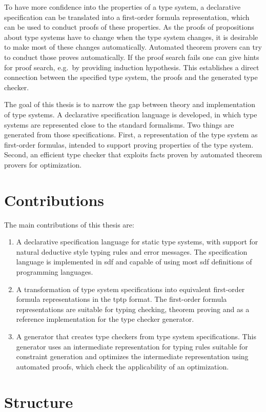 To have more confidence into the properties of a type system, a
declarative specification can be translated into a first-order formula
representation, which can be used to conduct proofs of these
properties. As the proofs of propositions about type systems have to
change when the type system changes, it is desirable to make most of
these changes automatically. Automated theorem provers can try to
conduct those proves automatically. If the proof search fails one can
give hints for proof search, e.g.\ by providing induction
hypothesis. This establishes a direct connection between the specified
type system, the proofs and the generated type checker.

The goal of this thesis is to narrow the gap between theory and
implementation of type systems. A declarative specification language
is developed, in which type systems are represented close to the
standard formalisms. Two things are generated from those
specifications. First, a representation of the type system as
first-order formulas, intended to support proving properties of the
type system. Second, an efficient type checker that exploits facts
proven by automated theorem provers for optimization.

\section{Contributions}
The main contributions of this thesis are:
\begin{enumerate}
\item A declarative specification language for static type systems,
  with support for natural deductive style typing rules and error
  messages. The specification language is implemented in \gls{sdf} and
  capable of using most \gls{sdf} definitions of programming
  languages.
\item A transformation of type system specifications into equivalent
  first-order formula representations in the \gls{tptp} format. The
  first-order formula representations are suitable for typing
  checking, theorem proving and as a reference implementation for the
  type checker generator.
\item A generator that creates type checkers from type system
  specifications. This generator uses an intermediate representation
  for typing rules suitable for constraint generation and optimizes
  the intermediate representation using automated proofs, which check
  the applicability of an optimization.
\end{enumerate}

\section{Structure}

